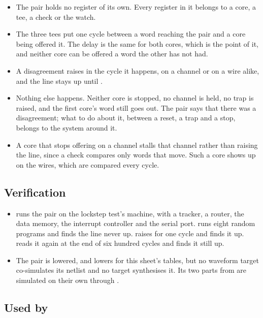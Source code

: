 \begin{itemize}
\item The pair holds no register of its own. Every register in it
belongs to a core, a tee, a check or the watch.
\item The three tees put one cycle between a word reaching the pair and
a core being offered it. The delay is the same for both cores, which is
the point of it, and neither core can be offered a word the other has
not had.
\item A disagreement raises  in the cycle it happens, on
a channel or on a wire alike, and the line stays up until .
\item Nothing else happens. Neither core is stopped, no channel is
held, no trap is raised, and the first core's word still goes out. The
pair says that there was a disagreement; what to do about it, between a
reset, a trap and a stop, belongs to the system around it.
\item A core that stops offering on a channel stalls that channel
rather than raising the line, since a check compares only words that
move. Such a core shows up on the wires, which are compared every
cycle.
\end{itemize}

\subsection*{Verification}

\begin{itemize}
\item {} runs the pair on the lockstep test's
machine, with a tracker, a router, the data memory, the interrupt
controller and the serial port.
 runs eight random
programs and finds the line never up.
 raises
 for one cycle and finds it up.
 reads it again at the
end of six hundred cycles and finds it still up.
\item The pair is lowered, and  lowers
 for this sheet's tables, but no waveform target
co-simulates its netlist and no target synthesises it. Its two parts from 
are simulated on their own through .
\end{itemize}

\subsection*{Used by}

